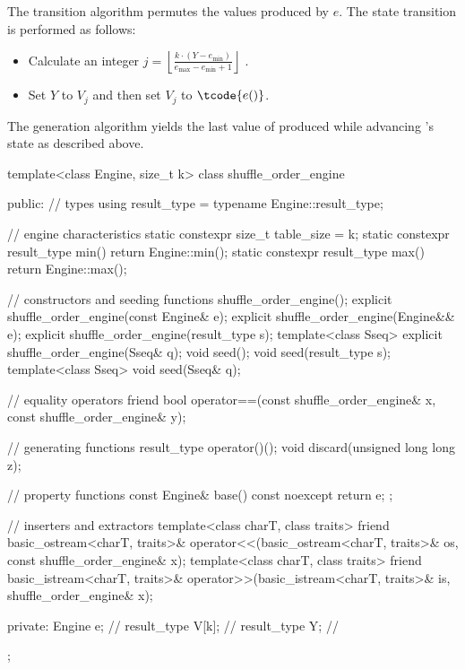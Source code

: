 \pnum
The transition algorithm
permutes the values produced by $e$.
The state transition is performed as follows:
\begin{itemize}
 \item
   Calculate an integer
   $j = \left\lfloor \frac{k \cdot (Y - e_{\min})}
                          {e_{\max} - e_{\min} +1}
        \right\rfloor
   $%
   .
 \item
   Set $Y$ to $V_j$ and then set $V_j$ to $\tcode{e()}$.
\end{itemize}

\pnum
The generation algorithm
yields the last value of 
 produced while advancing 's state as described above.

%
%
\begin{codeblock}
template<class Engine, size_t k>
  class shuffle_order_engine {
  public:
    // types
    using result_type = typename Engine::result_type;

    // engine characteristics
    static constexpr size_t table_size = k;
    static constexpr result_type min() { return Engine::min(); }
    static constexpr result_type max() { return Engine::max(); }

    // constructors and seeding functions
    shuffle_order_engine();
    explicit shuffle_order_engine(const Engine& e);
    explicit shuffle_order_engine(Engine&& e);
    explicit shuffle_order_engine(result_type s);
    template<class Sseq> explicit shuffle_order_engine(Sseq& q);
    void seed();
    void seed(result_type s);
    template<class Sseq> void seed(Sseq& q);

    // equality operators
    friend bool operator==(const shuffle_order_engine& x, const shuffle_order_engine& y);

    // generating functions
    result_type operator()();
    void discard(unsigned long long z);

    // property functions
    const Engine& base() const noexcept { return e; };

    // inserters and extractors
    template<class charT, class traits>
      friend basic_ostream<charT, traits>&
        operator<<(basic_ostream<charT, traits>& os, const shuffle_order_engine& x);
    template<class charT, class traits>
      friend basic_istream<charT, traits>&
        operator>>(basic_istream<charT, traits>& is, shuffle_order_engine& x);

  private:
    Engine e;           // \expos
    result_type V[k];   // \expos
    result_type Y;      // \expos
  };
\end{codeblock}

